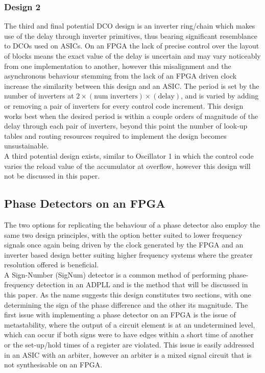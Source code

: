 \documentclass[conference]{IEEEtran}
\begin{document}
\subsubsection*{Design 2}
The third and final potential DCO design is an inverter ring/chain which makes use of the delay through inverter primitives, thus bearing significant resemblance to DCOs used on ASICs. On an FPGA the lack of precise control over the layout of blocks means the exact value of the delay is uncertain and may vary noticeably from one implementation to another, however this misalignment and the asynchronous behaviour stemming from the lack of an FPGA driven clock increase the similarity between this design and an ASIC. The period is set by the number of inverters at $2\times(\textrm{num inverters})\times(\textrm{delay})$, and is varied by adding or removing a pair of inverters for every control code increment. This design works best when the desired period is within a couple orders of magnitude of the delay through each pair of inverters, beyond this point the number of look-up tables and routing resources required to implement the design becomes unsustainable.\\
A third potential design exists, similar to Oscillator 1 in which the control code varies the reload value of the accumulator at overflow, however this design will not be discussed in this paper.

\subsection{Phase Detectors on an FPGA}
The two options for replicating the behaviour of a phase detector also employ the same two design principles, with the option better suited to lower frequency signals once again being driven by the clock generated by the FPGA and an inverter based design better suiting higher frequency systems where the greater resolution offered is beneficial.\\
A  Sign-Number (SigNum) detector is a common method of performing phase-frequency detection in an ADPLL and is the method that will be discussed in this paper. As the name suggests this design constitutes two sections, with one determining the sign of the phase difference and the other its magnitude. The first issue with implementing a phase detector on an FPGA is the issue of metastability, where the output of a circuit element is at an undetermined level, which can occur if both signs were to have edges within a short time of another or the set-up/hold times of a register are violated. This issue is easily addressed in an ASIC with an arbiter, however an arbiter is a mixed signal circuit that is not synthesisable on an FPGA.
\end{document}
